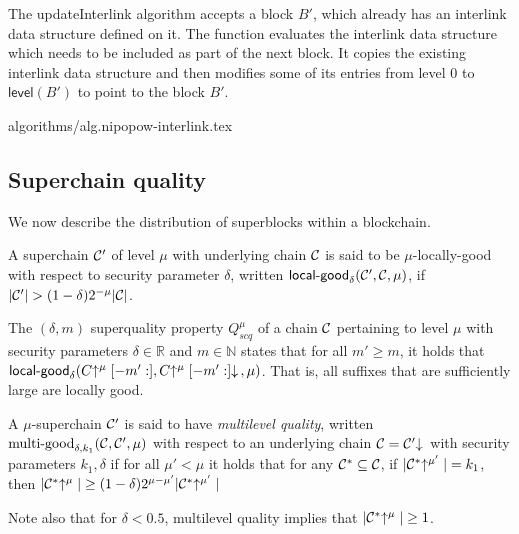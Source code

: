 The updateInterlink algorithm accepts a block $B'$, which already has an
interlink data structure defined on it. The function evaluates the
interlink data structure which needs to be included as part of the next block.
It copies the existing interlink data structure and
then modifies some of its entries from level $0$ to $\textsf{level}(B')$ to
point to the block $B'$.

{algorithms/alg.nipopow-interlink.tex}

\subsection{Superchain quality}

We now describe the distribution of superblocks within a blockchain.

\begin{definition}
A superchain $\mathcal{C}'$ of level
$\mu$ with underlying chain $\mathcal{C}$ is said to be $\mu$-\textnormal{locally-good}
with respect to security parameter $\delta$, written
$\textsf{local-good}_{\delta}(\mathcal{C}', \mathcal{C}, \mu)$, if $|\mathcal{C}'| > (1 -
\delta)2^{-\mu}|\mathcal{C}|$.
\end{definition}

\begin{definition}
The $(\delta, m)$ superquality property
$Q^\mu_{scq}$ of a chain $\mathcal{C}$ pertaining to level $\mu$ with security
parameters $\delta \in \mathbb{R}$ and $m \in \mathbb{N}$ states that for all
$m' \geq m$, it holds that $\textsf{local-good}_{\delta}(C\negthickspace\uparrow^\mu[-m':],
C\negthickspace\uparrow^\mu[-m':]\negthickspace\downarrow\,, \mu)$. That is, all suffixes that are
sufficiently large are locally good.
\end{definition}

\begin{definition}
A $\mu$-superchain $\mathcal{C}'$ is said to have \textit{multilevel quality}, written
$\textnormal{multi-good}_{\delta, k_1}(\mathcal{C}, \mathcal{C}', \mu)$ with respect to an
underlying chain $\mathcal{C} = \mathcal{C}'\negthickspace\downarrow\,$ with security parameters $k_1,
\delta$ if for all $\mu' < \mu$ it holds that for any $\mathcal{C}^* \subseteq \mathcal{C}$,
if $|\mathcal{C}^*\negthickspace\uparrow^{\mu'}| = k_1$, then $|\mathcal{C}^*\negthickspace\uparrow^{\mu}| \geq (1 -
\delta)2^{\mu - \mu'}|\mathcal{C}^*\negthickspace\uparrow^{\mu'}|$
\end{definition}

Note also that for $\delta < 0.5$, multilevel quality implies that
$|\mathcal{C}^*\negthickspace\uparrow^{\mu}| \geq 1$.

